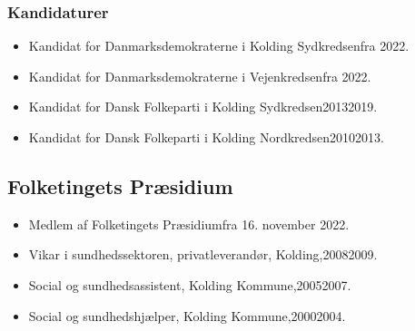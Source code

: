 \documentclass[11pt, a4paper]{awesome-cv}
\begin{document}
\begin{cvletter}
\subsubsection*{Kandidaturer}
\begin{itemize}
\item Kandidat for Danmarksdemokraterne i Kolding Sydkredsenfra 2022.
\item Kandidat for Danmarksdemokraterne i Vejenkredsenfra 2022.
\item Kandidat for Dansk Folkeparti i Kolding Sydkredsen20132019.
\item Kandidat for Dansk Folkeparti i Kolding Nordkredsen20102013.
\end{itemize}
\subsection*{Folketingets Præsidium}
\begin{itemize}
\item Medlem af Folketingets Præsidiumfra 16. november 2022.
\end{itemize}
\begin{itemize}
\item Vikar i sundhedssektoren, privatleverandør, Kolding,20082009.
\item Social og sundhedsassistent, Kolding Kommune,20052007.
\item Social og sundhedshjælper, Kolding Kommune,20002004.
\end{itemize}
\end{cvletter}
\end{document}
